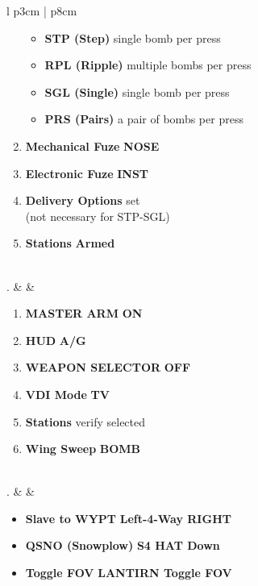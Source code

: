 \documentclass[8pt,usenames,dvipsnames,twoside]{article}
\begin{document}
\begin{center}
\begin{longtable}{l p{3cm} | p{8cm}}
\begin{minipage}[t]{\linewidth}
\begin{enumerate}[label=(\alph*)]
						\begin{itemize}
							\item \textbf{STP (Step)} single bomb per press
							\item \textbf{RPL (Ripple)} multiple bombs per press
							\item \textbf{SGL (Single)} single bomb per press
							\item \textbf{PRS (Pairs)} a pair of bombs per press
						\end{itemize}
						\item \textbf{Mechanical Fuze} \dotfill \textbf{NOSE}
						\item \textbf{Electronic Fuze} \dotfill \textbf{INST}
						\item \textbf{Delivery Options} \dotfill set \\
						\hfill (not necessary for STP-SGL)
						\item \textbf{Stations} \dotfill \textbf{Armed}
					\end{enumerate}
				\end{minipage} \\
				. &  & 
				\begin{minipage}[t]{\linewidth}
					\vspace{-7pt}
					\begin{enumerate}[label=(\alph*)]
						\item \textbf{MASTER ARM} \dotfill \textbf{ON}
						\item \textbf{HUD} \dotfill \textbf{A/G}
						\item \textbf{WEAPON SELECTOR} \dotfill \textbf{OFF}
						\item \textbf{VDI Mode} \dotfill \textbf{TV}
						\item \textbf{Stations} \dotfill verify selected
						\item \textbf{Wing Sweep} \dotfill \textbf{BOMB}
					\end{enumerate} 
				\end{minipage} \\
				. &  & 
				\begin{minipage}[t]{\linewidth}
					\vspace{-7pt}
					\begin{itemize}
						\item \textbf{Slave to WYPT} \dotfill \textbf{Left-4-Way RIGHT}
						\item \textbf{QSNO (Snowplow)} \dotfill \textbf{S4 HAT Down}
						\item \textbf{Toggle FOV} \dotfill \textbf{LANTIRN Toggle FOV}

\end{itemize}
\end{minipage}
\end{longtable}
\end{center}
\end{document}
